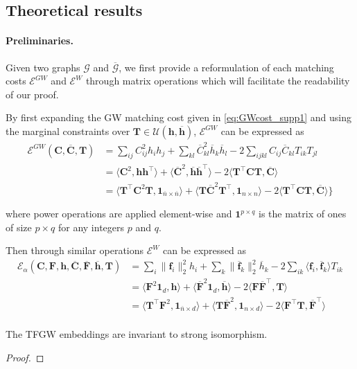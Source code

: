 \documentclass{article}
\newcommand{\scalar}[2]{\langle #1 , #2 \rangle}
\def\vf{{\bm{f}}}
\def\vh{{\bm{h}}}
\def\mC{{\bm{C}}}
\def\mF{{\bm{F}}}
\def\mT{{\bm{T}}}
\begin{document}
{\subsection{Theoretical results}

\paragraph{Preliminaries.} 
Given two graphs $\mathcal{G}$ and $\overline{\mathcal{G}}$, we first provide a reformulation of each matching costs $\mathcal{E}^{GW}$ and $\mathcal{E}^{W}$ through matrix operations which will facilitate the readability of our proof. 

By first expanding the GW matching cost given in \ref{eq:GWcost_supp1} and using the marginal constraints over $\mT \in \mathcal{U}(\vh, \overline{\vh})$, $\mathcal{E}^{GW}$ can be expressed as 
\begin{equation}\label{eq:GWcost_supp2}
\begin{split}
\mathcal{E}^{GW}(\mC, \overline{\mC}, \mT) &= \sum_{ij}C_{ij}^2 h_i h_j + \sum_{kl} \overline{C}_{kl}^2 \overline{h}_k \overline{h}_l - 2 \sum_{ijkl} C_{ij}\overline{C}_{kl}T_{ik}T_{jl}  \\
&= \scalar{\mC^2}{\vh\vh^\top} + \scalar{\overline{\mC}^2}{\overline{\vh}\overline{\vh}^\top} - 2 \scalar{\mT^\top \mC \mT}{\overline{\mC}} \\
&= \scalar{\mT^\top \mC^2 \mT}{\bm{1}_{\overline{n} \times \overline{n}}  } + \scalar{\mT \overline{\mC}^2 \mT^\top}{\bm{1}_{n \times n} } - 2 \scalar{\mT^\top \mC \mT}{\overline{\mC}} \}\\
\\ 
\end{split}
\end{equation}
where power operations are applied element-wise and $\bm{1}^{p \times q }$ is the matrix of ones of size $p \times q$ for any integers $p$ and $q$. 

Then through similar operations $\mathcal{E}^{W}$ can be expressed as
\begin{equation}\label{eq:Wcost_supp2}
\begin{split}
\mathcal{E}_{\alpha}(\mC, \mF, \vh, \overline{\mC}, \overline{\mF}, \overline{\vh}, \mT)  & =   \sum_{i} \| \vf_i \|_2^2 h_i  + \sum_k \| \overline{\vf}_k \|_2^2 \overline{h}_k- 2 \sum_{ik}\scalar{\vf_i}{\overline{\vf}_k} T_{ik}   \\
&= \scalar{\mF^2 \bm{1}_d}{\vh} + \scalar{\overline{\mF}^2 \bm{1}_d}{\overline{\vh}} - 2 \scalar{\mF \overline{\mF}^\top}{\mT}\\
&=\scalar{\mT^\top \mF^2 }{ \bm{1}_{\overline{n} \times d}} + \scalar{\mT \overline{\mF}^2 }{ \bm{1}_{n \times d}} - 2 \scalar{\mF^\top \mT}{ \overline{\mF}^\top}\\
\end{split}
\end{equation}
\setcounter{lemma}{0}
\begin{lemma}
	The TFGW embeddings are invariant to strong isomorphism.
\end{lemma}
\begin{proof}


\end{proof}}
\end{document}
